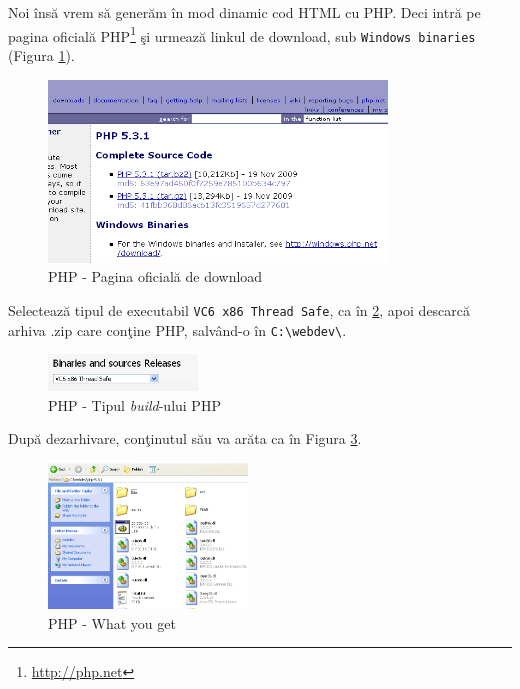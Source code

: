 Noi însă vrem să generăm în mod dinamic cod HTML cu PHP. Deci intră pe pagina oficială
PHP\footnote{\url{http://php.net}} şi urmează linkul de download,
sub \texttt{Windows binaries} (Figura \ref{fig:php win bin}).


\begin{figure}[h!]
  \centering
    \includegraphics[width=340px]{cap01/Screenshot-6.png}
  \caption{PHP - Pagina oficială de download}
  \label{fig:php win bin}
\end{figure}

Selectează tipul de executabil \texttt{VC6 x86 Thread Safe}, ca în \ref{fig:php build type}, apoi
descarcă arhiva .zip care conţine PHP, salvând-o în \texttt{C:{\textbackslash}webdev\textbackslash}.
\begin{figure}[h!]
  \centering
    \includegraphics[width=150px]{cap01/Screenshot-7.png}
  \caption{PHP - Tipul \textsl{build}-ului PHP}
  \label{fig:php build type}
\end{figure}



După dezarhivare, conţinutul său va arăta ca în Figura \ref{fig:php what you get}.

\begin{figure}[h!]
  \centering
    \includegraphics[width=200px]{cap01/Screenshot-9.png}
  \caption{PHP - What you get}
  \label{fig:php what you get}
\end{figure}

